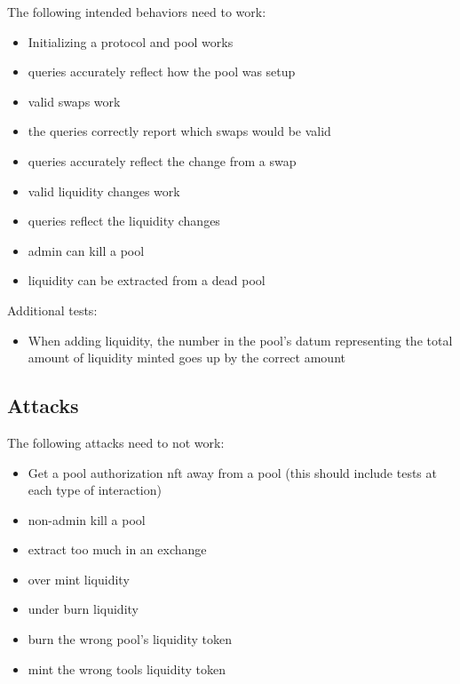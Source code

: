 \documentclass{article}
\begin{document}
The following intended behaviors need to work:
\begin{itemize}
  \item Initializing a protocol and pool works
  \item queries accurately reflect how the pool was setup
  \item valid swaps work
  \item the queries correctly report which swaps would be valid
  \item queries accurately reflect the change from a swap
  \item valid liquidity changes work
  \item queries reflect the liquidity changes
  \item admin can kill a pool
  \item liquidity can be extracted from a dead pool
\end{itemize}

Additional tests:
\begin{itemize}
  \item When adding liquidity, the number in the pool's datum representing the
    total amount of liquidity minted goes up by the correct amount
\end{itemize}

\subsection{Attacks}

The following attacks need to not work:
\begin{itemize}
  \item Get a pool authorization nft away from a pool (this should include tests at each type of interaction)
  \item non-admin kill a pool
  \item extract too much in an exchange
  \item over mint liquidity
  \item under burn liquidity
  \item burn the wrong pool’s liquidity token
  \item mint the wrong tools liquidity token
\end{itemize}
\end{document}
